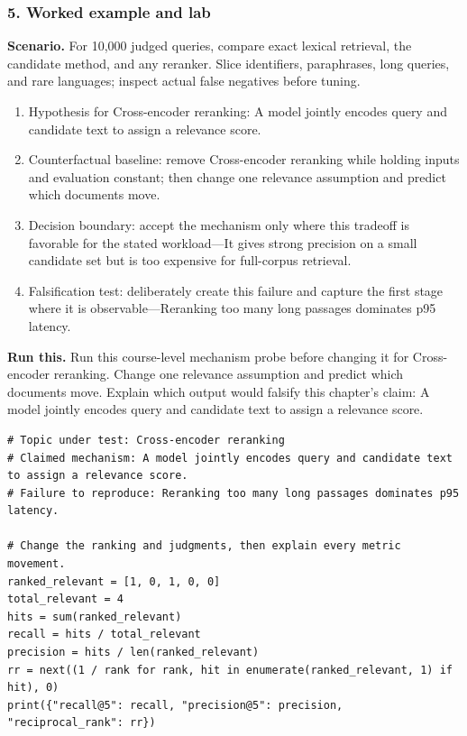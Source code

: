 \subsubsection*{5. Worked example and lab}
\textbf{Scenario.} For 10,000 judged queries, compare exact lexical retrieval, the candidate method, and any reranker. Slice identifiers, paraphrases, long queries, and rare languages; inspect actual false negatives before tuning.
\begin{enumerate}
\item Hypothesis for Cross-encoder reranking: A model jointly encodes query and candidate text to assign a relevance score.
\item Counterfactual baseline: remove Cross-encoder reranking while holding inputs and evaluation constant; then change one relevance assumption and predict which documents move.
\item Decision boundary: accept the mechanism only where this tradeoff is favorable for the stated workload—It gives strong precision on a small candidate set but is too expensive for full-corpus retrieval.
\item Falsification test: deliberately create this failure and capture the first stage where it is observable—Reranking too many long passages dominates p95 latency.
\end{enumerate}
\textbf{Run this.} Run this course-level mechanism probe before changing it for Cross-encoder reranking. Change one relevance assumption and predict which documents move. Explain which output would falsify this chapter's claim: A model jointly encodes query and candidate text to assign a relevance score.
\begin{Verbatim}[fontsize=\scriptsize]
# Topic under test: Cross-encoder reranking
# Claimed mechanism: A model jointly encodes query and candidate text to assign a relevance score.
# Failure to reproduce: Reranking too many long passages dominates p95 latency.

# Change the ranking and judgments, then explain every metric movement.
ranked_relevant = [1, 0, 1, 0, 0]
total_relevant = 4
hits = sum(ranked_relevant)
recall = hits / total_relevant
precision = hits / len(ranked_relevant)
rr = next((1 / rank for rank, hit in enumerate(ranked_relevant, 1) if hit), 0)
print({"recall@5": recall, "precision@5": precision, "reciprocal_rank": rr})
\end{Verbatim}
